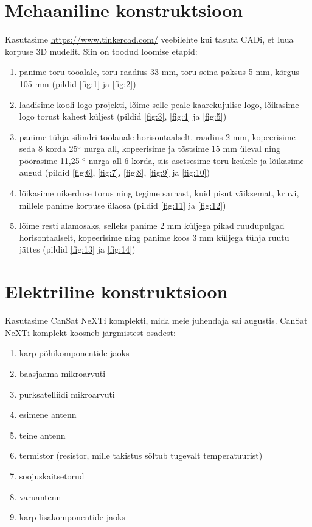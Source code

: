 \section{Mehaaniline konstruktsioon}

Kasutasime \url{https://www.tinkercad.com/} veebilehte kui tasuta CADi, et luua korpuse 3D mudelit. 
Siin on toodud loomise etapid:
\begin{enumerate}
    \item panime toru tööalale, toru raadius 33 mm, toru seina paksus 5 mm, kõrgus 105 mm (pildid \ref{fig:1} ja \ref{fig:2})
    \item laadisime kooli logo projekti, lõime selle peale kaarekujulise logo, lõikasime logo torust kahest küljest (pildid \ref{fig:3}, \ref{fig:4} ja \ref{fig:5})
    \item panime tühja silindri töölauale horisontaalselt, raadius 2 mm, kopeerisime seda 8 korda 25$^\text{o}$ nurga all, kopeerisime ja tõstsime 15 mm üleval ning pöörasime 11,25 $^\text{o}$ nurga all 6 korda, siis asetsesime toru keskele ja lõikasime augud (pildid \ref{fig:6}, \ref{fig:7}, \ref{fig:8}, \ref{fig:9} ja \ref{fig:10})
    \item lõikasime nikerduse torus ning tegime sarnast, kuid pisut väiksemat, kruvi, millele panime korpuse ülaosa (pildid \ref{fig:11} ja \ref{fig:12})
    \item lõime resti alamosaks, selleks panime 2 mm küljega pikad ruudupulgad horisontaalselt, kopeerisime ning panime koos 3 mm küljega tühja ruutu jättes (pildid \ref{fig:13} ja \ref{fig:14})
\end{enumerate}

\section{Elektriline konstruktsioon}

Kasutasime CanSat NeXTi komplekti, mida meie juhendaja sai augustis.
CanSat NeXTi komplekt koosneb järgmistest osadest:
\begin{enumerate}
    \item karp põhikomponentide jaoks 
    \item baasjaama mikroarvuti 
    \item purksatelliidi mikroarvuti 
    \item esimene antenn 
    \item teine antenn 
    \item termistor (resistor, mille takistus sõltub tugevalt temperatuurist) 
    \item soojuskaitsetorud
    \item varuantenn 
    \item karp lisakomponentide jaoks
\end{enumerate}

